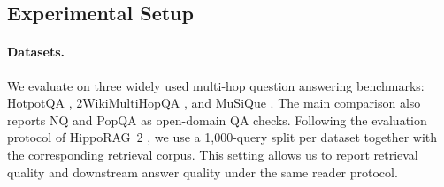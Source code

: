 \subsection{Experimental Setup}
\label{sec:experiments:setup}

\paragraph{Datasets.}
We evaluate on three widely used multi-hop question answering
benchmarks: HotpotQA \citep{yang2018hotpotqa}, 2WikiMultiHopQA
\citep{ho2020constructing}, and MuSiQue \citep{trivedi2022musique}.
The main comparison also reports NQ and PopQA as open-domain QA checks.
Following the evaluation protocol of HippoRAG~2
\citep{gutierrez2025hipporag}, we use a 1{,}000-query split per dataset
together with the corresponding retrieval corpus. This setting allows
us to report retrieval quality and downstream answer quality under the
same reader protocol.

